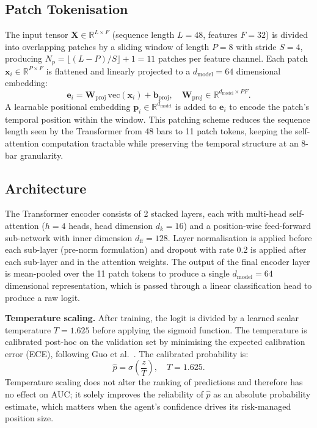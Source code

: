 \subsection{Patch Tokenisation}

The input tensor $\mathbf{X} \in \mathbb{R}^{L \times F}$ (sequence length $L = 48$, features $F = 32$) is divided into overlapping patches by a sliding window of length $P = 8$ with stride $S = 4$, producing $N_p = \lfloor (L - P) / S \rfloor + 1 = 11$ patches per feature channel. Each patch $\mathbf{x}_i \in \mathbb{R}^{P \times F}$ is flattened and linearly projected to a $d_{\text{model}} = 64$ dimensional embedding:
\begin{equation}
    \mathbf{e}_i = \mathbf{W}_{\text{proj}}\,\text{vec}(\mathbf{x}_i) + \mathbf{b}_{\text{proj}}, \quad \mathbf{W}_{\text{proj}} \in \mathbb{R}^{d_{\text{model}} \times PF}.
\end{equation}
A learnable positional embedding $\mathbf{p}_i \in \mathbb{R}^{d_{\text{model}}}$ is added to $\mathbf{e}_i$ to encode the patch's temporal position within the window. This patching scheme reduces the sequence length seen by the Transformer from 48 bars to 11 patch tokens, keeping the self-attention computation tractable while preserving the temporal structure at an 8-bar granularity.

\subsection{Architecture}

The Transformer encoder consists of 2 stacked layers, each with multi-head self-attention ($h = 4$ heads, head dimension $d_k = 16$) and a position-wise feed-forward sub-network with inner dimension $d_{\text{ff}} = 128$. Layer normalisation is applied before each sub-layer (pre-norm formulation) and dropout with rate 0.2 is applied after each sub-layer and in the attention weights. The output of the final encoder layer is mean-pooled over the 11 patch tokens to produce a single $d_{\text{model}} = 64$ dimensional representation, which is passed through a linear classification head to produce a raw logit.


\textbf{Temperature scaling.} After training, the logit is divided by a learned scalar temperature $T = 1.625$ before applying the sigmoid function. The temperature is calibrated post-hoc on the validation set by minimising the expected calibration error (ECE), following Guo et al.~\cite{guo2017calibration}. The calibrated probability is:
\begin{equation}
    \hat{p} = \sigma\!\left(\frac{z}{T}\right), \quad T = 1.625.
\end{equation}
Temperature scaling does not alter the ranking of predictions and therefore has no effect on AUC; it solely improves the reliability of $\hat{p}$ as an absolute probability estimate, which matters when the agent's confidence drives its risk-managed position size.

